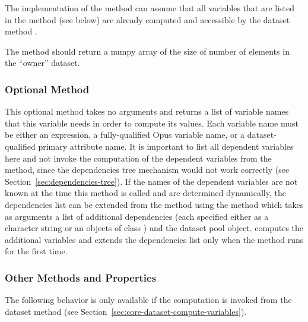 {The implementation of the  method can assume that all
variables \variablesindex that are listed in the
 method (see below) are already computed and accessible by the dataset \datasetindex
method .

The  method should return a numpy array \numpyindex of the size of number
of elements in the ``owner'' dataset. \datasetindex

\subsubsection{Optional Method }
 
\label{sec:dependencies}
%
This optional method takes no arguments and returns a list of variable \variablesindex names
that this variable \variablesindex needs in order to compute its values. Each variable \variablesindex name
must be either an expression, a fully-qualified Opus variable \variablesindex name, or a dataset-qualified \datasetindex
primary attribute \primaryattributesindex name. It is important to list all dependent variables \variablesindex
here and not invoke the computation of the dependent variables \variablesindex from the
 method, since the dependencies tree mechanism would not
work correctly (see Section~\ref{sec:dependencies-tree}). If the names of the
dependent variables \variablesindex are not known at the time this method is called and are determined dynamically, the
dependencies list can be extended from the  method using the
 \variablesindex method  which takes as arguments
a list of additional dependencies (each specified either as a character string or an objects of class ) 
and the dataset pool object. \attributesindex {} computes 
the additional variables and extends the
dependencies list only when the  method runs for the first
time.

\subsubsection{Other Methods and Properties}
%
The following behavior is only available if the computation is invoked from the dataset method  
 (see Section~\ref{sec:core-dataset-compute-variables}).

}
